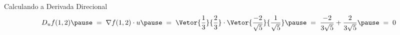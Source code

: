 \begin{resolution}{Calculando a Derivada Direcional}
  \[
    D_u f(1, 2)
    \pause
    \;=\; \nabla f(1, 2) \cdot u
    \pause
    \;=\; \Vetor{\frac{1}{3}}{\frac{2}{3}} \cdot
          \Vetor{\frac{-2}{\sqrt{5}}}{\frac{1}{\sqrt{5}}}
    \pause
    \;=\; \frac{-2}{3\sqrt{5}} + \frac{2}{3\sqrt{5}}
    \pause
    \;=\; 0
  \]
\end{resolution}

